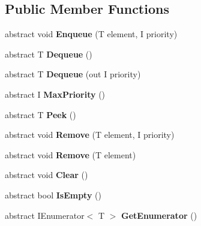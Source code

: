 \subsection*{Public Member Functions}
\begin{DoxyCompactItemize}
\item 
\mbox{\label{class_data_structures_1_1_priority_queue_a61be8a39a46e024b9c525e303c2e3a9c}} 
abstract void {\bfseries Enqueue} (T element, I priority)
\item 
\mbox{\label{class_data_structures_1_1_priority_queue_a8a732750bad53930ba59e9d53893efd0}} 
abstract T {\bfseries Dequeue} ()
\item 
\mbox{\label{class_data_structures_1_1_priority_queue_a9e1ce2ebad51263dee248c2e2538946a}} 
abstract T {\bfseries Dequeue} (out I priority)
\item 
\mbox{\label{class_data_structures_1_1_priority_queue_ab4b2bddca269934a3f208bf0070fd392}} 
abstract I {\bfseries Max\+Priority} ()
\item 
\mbox{\label{class_data_structures_1_1_priority_queue_a91777550673283c472a559a87735b7a9}} 
abstract T {\bfseries Peek} ()
\item 
\mbox{\label{class_data_structures_1_1_priority_queue_abc51f812d0d3fac90e7d5b5ef9a1e245}} 
abstract void {\bfseries Remove} (T element, I priority)
\item 
\mbox{\label{class_data_structures_1_1_priority_queue_a5736c78300aa3cfcb633d3676c8fb20e}} 
abstract void {\bfseries Remove} (T element)
\item 
\mbox{\label{class_data_structures_1_1_priority_queue_a8dfb2ec9123a0c60c28098b388e1e545}} 
abstract void {\bfseries Clear} ()
\item 
\mbox{\label{class_data_structures_1_1_priority_queue_ae632f425192bffb62ba226b3c4a09111}} 
abstract bool {\bfseries Is\+Empty} ()
\item 
\mbox{\label{class_data_structures_1_1_priority_queue_a91546a1854a4aa9c404b83c4f2f630b7}} 
abstract I\+Enumerator$<$ T $>$ {\bfseries Get\+Enumerator} ()
\end{DoxyCompactItemize}
